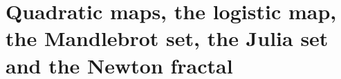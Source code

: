 
\chapter{Quadratic maps, the logistic map, the Mandlebrot set, the Julia set and the Newton fractal}

